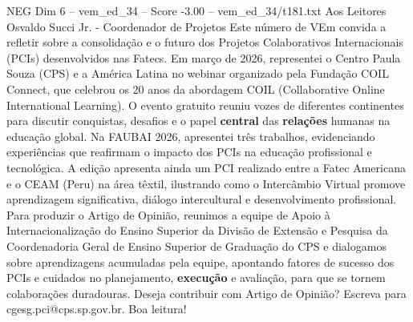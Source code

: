 \begin{textsample}{NEG Dim 6 – vem\_ed\_34 – Score -3.00 – vem\_ed\_34/t181.txt}  \label{ex:f6_neg_002}
Aos Leitores Osvaldo Succi Jr. - Coordenador de Projetos Este número de VEm convida a refletir sobre a consolidação e o futuro dos Projetos Colaborativos Internacionais (PCIs) desenvolvidos nas Fatecs.
Em março de 2026, representei o Centro Paula Souza (CPS) e a América Latina no webinar organizado pela Fundação COIL Connect, que celebrou os 20 anos da abordagem COIL (Collaborative Online International Learning).
O evento gratuito reuniu vozes de diferentes continentes para discutir conquistas, desafios e o papel \textbf{central} das \textbf{relações} humanas na educação global.
Na FAUBAI 2026, apresentei três trabalhos, evidenciando experiências que reafirmam o impacto dos PCIs na educação profissional e tecnológica.
A edição apresenta ainda um PCI realizado entre a Fatec Americana e o CEAM (Peru) na área têxtil, ilustrando como o Intercâmbio Virtual promove aprendizagem significativa, diálogo intercultural e desenvolvimento profissional.
Para produzir o Artigo de Opinião, reunimos a equipe de Apoio à Internacionalização do Ensino Superior da Divisão de Extensão e Pesquisa da Coordenadoria Geral de Ensino Superior de Graduação do CPS e dialogamos sobre aprendizagens acumuladas pela equipe, apontando fatores de sucesso dos PCIs e cuidados no planejamento, \textbf{execução} e avaliação, para que se tornem colaborações duradouras.
Deseja contribuir com Artigo de Opinião?
Escreva para cgesg.pci@cps.sp.gov.br.
Boa leitura!

\end{textsample}
